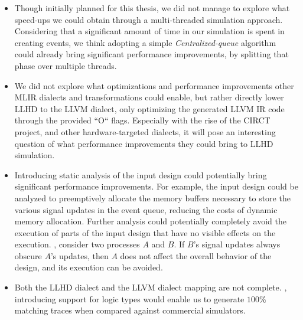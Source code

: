 \begin{itemize}
  \item Though initially planned for this thesis, we did not manage to explore what speed-ups we could obtain through a multi-threaded simulation approach. Considering that a significant amount of time in our simulation is spent in creating events, we think adopting a simple \textit{Centralized-queue} algorithm~\cite{Ashenden1994} could already bring significant performance improvements, by splitting that phase over multiple threads.
  \item We did not explore what optimizations and performance improvements other MLIR dialects and transformations could enable, but rather directly lower LLHD to the LLVM dialect, only optimizing the generated LLVM IR code through the provided “O“ flags. Especially with the rise of the CIRCT project, and other hardware-targeted dialects, it will pose an interesting question of what performance improvements they could bring to LLHD simulation.
  \item Introducing static analysis of the input design could potentially bring significant performance improvements. For example, the input design could be analyzed to preemptively allocate the memory buffers necessary to store the various signal updates in the event queue, reducing the costs of dynamic memory allocation. Further analysis could potentially completely avoid the execution of parts of the input design that have no visible effects on the execution. \Eg, consider two processes $A$ and $B$. If $B$'s signal updates always obscure $A$'s updates, then $A$ does not affect the overall behavior of the design, and its execution can be avoided.
  \item Both the LLHD dialect and the LLVM dialect mapping are not complete. \Eg, introducing support for logic types would enable us to generate $100\%$ matching traces when compared against commercial simulators.
\end{itemize}




